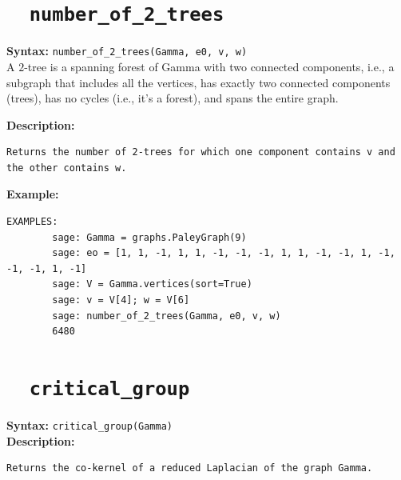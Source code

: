 \documentclass{article}
\begin{document}
\section{\tt \ \ number\_of\_2\_trees}

\textbf{Syntax:} \verb}number_of_2_trees(Gamma, e0, v, w)}\\

A $2$-tree is a spanning forest of Gamma with two connected components, i.e., a subgraph that
includes all the vertices,
has exactly two connected components (trees),
has no cycles (i.e., it's a forest),
and spans the entire graph.

\textbf{Description:}
\begin{verbatim}
Returns the number of 2-trees for which one component contains v and the other contains w.
\end{verbatim}

\textbf{Example:}
\begin{verbatim}
EXAMPLES:
        sage: Gamma = graphs.PaleyGraph(9)
        sage: eo = [1, 1, -1, 1, 1, -1, -1, -1, 1, 1, -1, -1, 1, -1, -1, -1, 1, -1]
        sage: V = Gamma.vertices(sort=True)
        sage: v = V[4]; w = V[6]
        sage: number_of_2_trees(Gamma, e0, v, w)
        6480
\end{verbatim}

\section{\tt \ \ critical\_group}
\textbf{Syntax:} \verb}critical_group(Gamma)}\\

\textbf{Description:}
\begin{verbatim}
Returns the co-kernel of a reduced Laplacian of the graph Gamma.
\end{verbatim}
\end{document}
